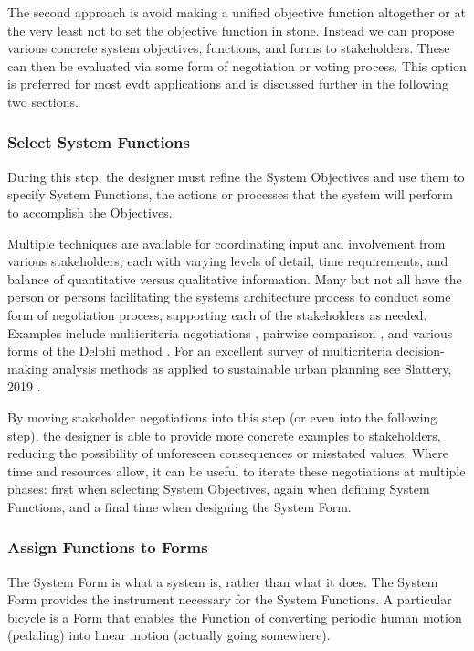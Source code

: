 The second approach is avoid making a unified objective function altogether or at the very least not to set the objective function in stone. Instead we can propose various concrete system objectives, functions, and forms to stakeholders. These can then be evaluated via some form of negotiation or voting process. This option is preferred for most \ac{evdt} applications and is discussed further in the following two sections.  


\subsubsection{Select System Functions}

During this step, the designer must refine the System Objectives and use them to specify System Functions, the actions or processes that the system will perform to accomplish the Objectives.

Multiple techniques are available for coordinating input and involvement from various stakeholders, each with varying levels of detail, time requirements, and balance of quantitative versus qualitative information. Many but not all have the person or persons facilitating the systems architecture process to conduct some form of negotiation process, supporting each of the stakeholders as needed. Examples include  multicriteria negotiations \cite{sparrevikUseMulticriteriaInvolvement2011},  pairwise comparison \cite{motieyanSustainableUrbanPlanning2017}, and various forms of the Delphi method \cite{morganUrbanPlanningUsing1979}. For an excellent survey of multicriteria decision-making analysis methods as applied to sustainable urban planning see Slattery, 2019 \cite{slatteryQuantitativeAssessmentSustainable2019}.

By moving stakeholder negotiations into this step (or even into the following step), the designer is able to provide more concrete examples to stakeholders, reducing the possibility of unforeseen consequences or misstated values. Where time and resources allow, it can be useful to iterate these negotiations at multiple phases: first when selecting System Objectives, again when defining System Functions, and a final time when designing the System Form.


\subsubsection{Assign Functions to Forms} \label{sec:saf-assign}

The System Form is what a system is, rather than what it does. The System Form provides the instrument necessary for the System Functions. A particular bicycle is a Form that enables the Function of converting periodic human motion (pedaling) into linear motion (actually going somewhere).

